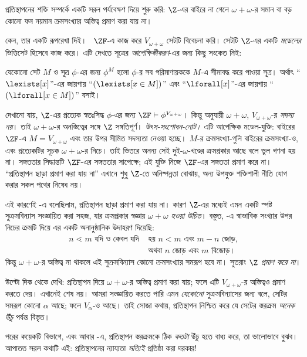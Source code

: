 \documentclass[../../../include/open-logic-section]{subfiles}
\begin{document}

প্রতিস্থাপনের শক্তি সম্পর্কে একটি সরল পর্যবেক্ষণ
দিয়ে শুরু করি: $\Z$-এর বাইরে না গেলে
$\omega + \omega$-র সমান বা বড় কোনো
ফন নয়মান ক্রমসংখ্যার অস্তিত্ব প্রমাণ করা যায় না।

কেন, তার একটি রূপরেখা দিই।
~$\ZF$-এ কাজ করে $V_{\omega+\omega}$
সেটটি বিবেচনা করি। সেটটি $\Z$-এর একটি
\emph{মডেলের} ভিত্তিসেট হিসেবে কাজ করে।
এটি দেখতে সূত্রের \emph{আপেক্ষিকীকরণ}-এর জন্য
কিছু সংকেত নিই:
\begin{defn}
	যেকোনো সেট $M$ ও সূত্র $\phi$-এর জন্য
	$\phi^M$ হলো $\phi$-র সব পরিমাণায়ককে
	$M$-এ সীমাবদ্ধ করে পাওয়া সূত্র। অর্থাৎ
	``$\lexists[x]$''-এর জায়গায়
	``$(\lexists[x \in M])$'' এবং
	``$\lforall[x]$''-এর জায়গায়
	``$(\lforall[x \in M])$'' বসাই।
\end{defn}\noindent
দেখানো যায়, $\Z$-এর প্রত্যেক স্বতঃসিদ্ধ
$\phi$-এর জন্য $\ZF \vdash
\phi^{V_{\omega+\omega}}$। কিন্তু
 অনুযায়ী
$\omega+\omega$, $V_{\omega+\omega}$-র
\emph{সদস্য নয়}। তাই $\omega+\omega$-র
অনস্তিত্বের সঙ্গে $\Z$ সঙ্গতিপূর্ণ।
\emph{উৎস-সংশোধন-নোট।} এটি আপেক্ষিক মডেল-যুক্তি:
বাইরের $\ZF$-এ $M=V_{\omega+\omega}$ এবং তার উপর সীমিত
সদস্যতা নেওয়া হচ্ছে। $M$-র ক্রমসংখ্যা-গুলি বাইরের ক্রমসংখ্যা-ও,
এবং প্রত্যেকটির সূচক $\omega+\omega$-র নিচে। তাই ভিতরে
অনন্য সেই দুই-$\omega$-খণ্ডের ক্রমপ্রকার আছে বলে ভুল গণনা হয় না।
সঙ্গততার সিদ্ধান্তটি $\ZF$-এর সঙ্গততার সাপেক্ষে; এই যুক্তি
নিজে $\ZF$-এর সঙ্গততা প্রমাণ করে না। ``প্রতিস্থাপন ছাড়া
প্রমাণ করা যায় না'' এখানে শুধু $\Z$-তে অনিষ্পন্নতা বোঝায়,
অন্য উপযুক্ত শক্তিশালী নীতি যোগ করার সকল পথের নিষেধ নয়।

এই কারণেই -এ
বলেছিলাম, প্রতিস্থাপন ছাড়া
প্রমাণ করা যায় না। কারণ $\Z$-এর মধ্যেই
এমন একটি স্পষ্ট সুক্রমবিন্যাস সংজ্ঞায়িত করা
সহজ, যার ক্রমপ্রকার স্বজ্ঞায় $\omega+\omega$
\emph{হওয়া উচিত}। বস্তুত,
-এ স্বাভাবিক সংখ্যার
উপর নিচের ক্রমটি দিয়ে এর একটি অনানুষ্ঠানিক
উদাহরণ দিয়েছি:
\begin{align*}
	n \lessdot m \text{ যদি ও কেবল যদি }&\text{হয় }n < m\text{ এবং }m-n\text{ জোড়,}\\
	& \text{অথবা $n$ জোড় এবং $m$ বিজোড়।}
\end{align*}
কিন্তু $\omega+\omega$-র অস্তিত্ব না থাকলে
এই সুক্রমবিন্যাস কোনো ক্রমসংখ্যার সমরূপ হবে
না। সুতরাং $\Z$
\emph{প্রমাণ করে না}।

উল্টো দিক থেকে দেখি: প্রতিস্থাপন দিয়ে
$\omega+\omega$-র অস্তিত্ব প্রমাণ করা যায়;
ফলে এটি $V_{\omega+\omega}$-র অস্তিত্বও
প্রমাণ করতে দেয়। এখানেই শেষ নয়।
আমরা সংজ্ঞায়িত করতে পারি এমন
\emph{যেকোনো} সুক্রমবিন্যাসের জন্য
বলে, সেটির সমরূপ কোনো $\alpha$ আছে;
ফলে $V_\alpha$-ও আছে। তাই সোজা কথায়,
প্রতিস্থাপন নিশ্চিত করে যে সেটের স্তরক্রম
\emph{অনেক উঁচু} পর্যন্ত বিস্তৃত।

পরের কয়েকটি বিভাগে, এবং আবার
-এ,
প্রতিস্থাপন স্তরক্রমকে ঠিক \emph{কতটা}
উঁচু হতে বাধ্য করে, তা ভালোভাবে বুঝব।
আপাতত সরল কথাটি এই: প্রতিস্থাপনের
ন্যায্যতা \emph{সত্যিই} প্রতিষ্ঠা করা দরকার!
\end{document}
